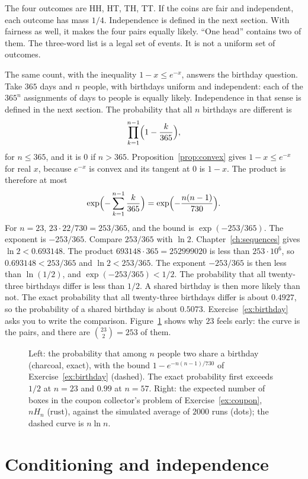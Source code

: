 The four outcomes are HH, HT, TH, TT. If the coins are fair and independent, each outcome has mass $1/4$. Independence is defined in the next section. With fairness as well, it makes the four pairs equally likely. ``One head'' contains two of them. The three-word list is a legal set of events. It is not a uniform set of outcomes.

The same count, with the inequality $1-x\le e^{-x}$, answers the birthday question. Take $365$ days and $n$ people, with birthdays uniform and independent: each of the $365^n$ assignments of days to people is equally likely. Independence in that sense is defined in the next section. The probability that all $n$ birthdays are different is
\[
 \prod_{k=1}^{n-1}\Bigl(1-\frac{k}{365}\Bigr),
\]
for $n\le365$, and it is $0$ if $n>365$. Proposition~\ref{prop:convex} gives $1-x\le e^{-x}$ for real $x$, because $e^{-x}$ is convex and its tangent at $0$ is $1-x$. The product is therefore at most
\[
 \exp\Bigl(-\sum_{k=1}^{n-1}\frac{k}{365}\Bigr)=\exp\Bigl(-\frac{n(n-1)}{730}\Bigr).
\]
For $n=23$, $23\cdot22/730=253/365$, and the bound is $\exp(-253/365)$. The exponent is $-253/365$. Compare $253/365$ with $\ln2$. Chapter~\ref{ch:sequences} gives $\ln2<0.693148$. The product $693148\cdot365=252999020$ is less than $253\cdot10^6$, so $0.693148<253/365$ and $\ln2<253/365$. The exponent $-253/365$ is then less than $\ln(1/2)$, and $\exp(-253/365)<1/2$. The probability that all twenty-three birthdays differ is less than $1/2$. A shared birthday is then more likely than not. The exact probability that all twenty-three birthdays differ is about $0.4927$, so the probability of a shared birthday is about $0.5073$. Exercise~\ref{ex:birthday} asks you to write the comparison. Figure~\ref{fig:birthday} shows why $23$ feels early: the curve is the pairs, and there are $\binom{23}2=253$ of them.

\begin{figure}[ht]
\centering
{}
\caption{Left: the probability that among $n$ people two share a birthday (charcoal, exact), with the bound $1-e^{-n(n-1)/730}$ of Exercise~\ref{ex:birthday} (dashed). The exact probability first exceeds $1/2$ at $n=23$ and $0.99$ at $n=57$. Right: the expected number of boxes in the coupon collector's problem of Exercise~\ref{ex:coupon}, $nH_n$ (rust), against the simulated average of $2000$ runs (dots); the dashed curve is $n\ln n$.}
\label{fig:birthday}
\end{figure}

\section{Conditioning and independence}

